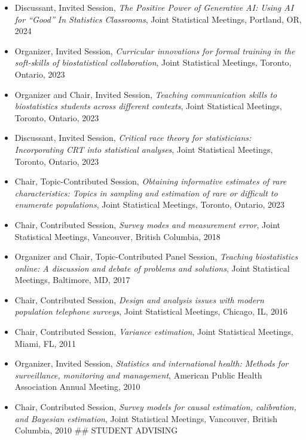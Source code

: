 \documentclass[
  english,
  letterpaper,
  DIV=11,
  numbers=noendperiod]{scrartcl}
\providecommand{\tightlist}{%
  \setlength{\itemsep}{0pt}\setlength{\parskip}{0pt}}
\begin{document}
\begin{itemize}
\tightlist
\item
  Discussant, Invited Session, \emph{The Positive Power of Generative
  AI: Using AI for ``Good'' In Statistics Classrooms}, Joint Statistical
  Meetings, Portland, OR, 2024
\item
  Organizer, Invited Session, \emph{Curricular innovations for formal
  training in the soft-skills of biostatistical collaboration}, Joint
  Statistical Meetings, Toronto, Ontario, 2023
\item
  Organizer and Chair, Invited Session, \emph{Teaching communication
  skills to biostatistics students across different contexts}, Joint
  Statistical Meetings, Toronto, Ontario, 2023
\item
  Discussant, Invited Session, \emph{Critical race theory for
  statisticians: Incorporating CRT into statistical analyses}, Joint
  Statistical Meetings, Toronto, Ontario, 2023
\item
  Chair, Topic-Contributed Session, \emph{Obtaining informative
  estimates of rare characteristics: Topics in sampling and estimation
  of rare or difficult to enumerate populations}, Joint Statistical
  Meetings, Toronto, Ontario, 2023
\item
  Chair, Contributed Session, \emph{Survey modes and measurement error},
  Joint Statistical Meetings, Vancouver, British Columbia, 2018
\item
  Organizer and Chair, Topic-Contributed Panel Session, \emph{Teaching
  biostatistics online: A discussion and debate of problems and
  solutions}, Joint Statistical Meetings, Baltimore, MD, 2017
\item
  Chair, Contributed Session, \emph{Design and analysis issues with
  modern population telephone surveys}, Joint Statistical Meetings,
  Chicago, IL, 2016
\item
  Chair, Contributed Session, \emph{Variance estimation}, Joint
  Statistical Meetings, Miami, FL, 2011
\item
  Organizer, Invited Session, \emph{Statistics and international health:
  Methods for surveillance, monitoring and management}, American Public
  Health Association Annual Meeting, 2010
\item
  Chair, Contributed Session, \emph{Survey models for causal estimation,
  calibration, and Bayesian estimation}, Joint Statistical Meetings,
  Vancouver, British Columbia, 2010 \#\# STUDENT ADVISING
\end{itemize}
\end{document}
